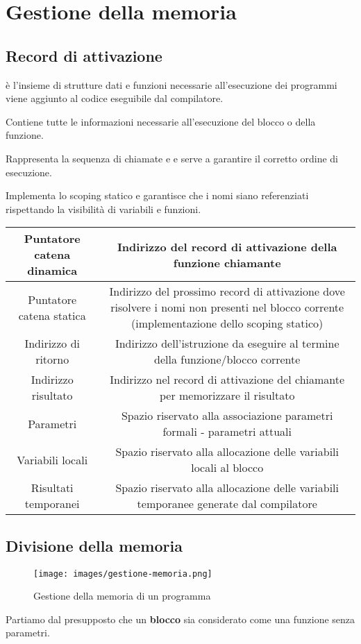 \newpage
\section{Gestione della memoria}
\subsection{Record di attivazione}
\begin{definition}
	è l'insieme di strutture dati e funzioni necessarie all'esecuzione dei programmi viene aggiunto al codice eseguibile dal compilatore.
\end{definition}
\begin{definition}
	Contiene tutte le informazioni necessarie all'esecuzione del blocco o della funzione.
\end{definition}
\begin{definition}
	Rappresenta la sequenza di chiamate e e serve a garantire il corretto ordine di esecuzione.
\end{definition}
\begin{definition}
	Implementa lo scoping statico e garantisce che i nomi siano referenziati rispettando la visibilità di variabili e funzioni.
\end{definition}
\begin{tabular} { |c|c|}
	\hline
	Puntatore catena dinamica  & Indirizzo del record di attivazione della funzione chiamante\\
	\hline
	Puntatore catena statica & Indirizzo del prossimo record di attivazione dove risolvere i nomi
		non presenti nel blocco corrente (implementazione dello scoping
		statico) \\
	\hline
	Indirizzo di ritorno & Indirizzo dell’istruzione da eseguire al termine della funzione/blocco corrente \\
	\hline
	Indirizzo risultato & Indirizzo nel record di attivazione del chiamante per memorizzare il risultato \\
	\hline
	Parametri & Spazio riservato alla associazione parametri formali - parametri attuali \\
	\hline
	Variabili locali & Spazio riservato alla allocazione delle variabili locali al blocco \\
	\hline
	Risultati temporanei & Spazio riservato alla allocazione delle variabili temporanee generate dal compilatore \\
	\hline
\end{tabular}
\subsection{Divisione della memoria}
\begin{figure}[h!]
	\centering
	\texttt{[image: images/gestione-memoria.png]}
	\caption{Gestione della memoria di un programma}
\end{figure}
\begin{note}
	Partiamo dal presupposto che un \textbf{blocco} sia considerato come una funzione senza parametri.
\end{note}